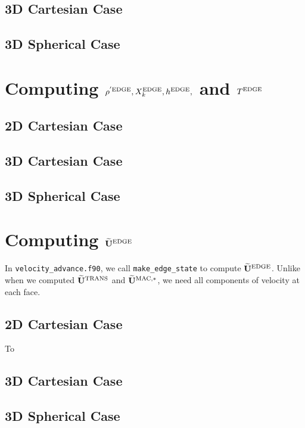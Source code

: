 \documentclass[11pt]{article}
\def\edge  {\rm EDGE}
\def\mac   {\rm MAC}
\def\trans {\rm TRANS}
\def\Ubt   {\widetilde{\bf U}}
\begin{document}
\subsection{3D Cartesian Case}
\subsection{3D Spherical Case}
\section{Computing $\rho^{'\edge}, X_k^{\edge}, h^{\edge},$ and $T^{\edge}$}
\subsection{2D Cartesian Case}
\subsection{3D Cartesian Case}
\subsection{3D Spherical Case}
\section{Computing $\Ubt^{\edge}$}
In {\tt velocity\_advance.f90}, we call {\tt make\_edge\_state} to compute $\Ubt^{\edge}$.  Unlike when we computed $\Ubt^{\trans}$ and $\Ubt^{\mac,*}$, we need all components of velocity at each face.
\subsection{2D Cartesian Case}
To 
\subsection{3D Cartesian Case}
\subsection{3D Spherical Case}
\cleardoublepage
\end{document}
